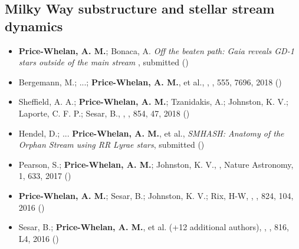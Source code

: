 \documentclass[12pt,letterpaper]{article}
\begin{document}
    \subsection*{Milky Way substructure and stellar stream dynamics}
    \begin{itemize}

\item {\bf Price-Whelan, A. M.}; Bonaca, A.
    {\it Off the beaten path: Gaia reveals GD-1 stars outside of the main stream
},
    submitted ()

\item Bergemann, M.; ...; {\bf Price-Whelan, A. M.}, et al.,
    ,
    \nature, 555, 7696, 2018 ()

\item Sheffield, A. A.; {\bf Price-Whelan, A. M.}; Tzanidakis, A.; Johnston, K. V.; Laporte, C. F. P.; Sesar, B.,
    ,
    \apj, 854, 47, 2018 ()

\item Hendel, D.; ... {\bf Price-Whelan, A. M.}, et al.,
    {\it SMHASH: Anatomy of the Orphan Stream using RR Lyrae stars},
    submitted ()

\item Pearson, S.; {\bf Price-Whelan, A. M.}; Johnston, K. V.,
    ,
    Nature Astronomy, 1, 633, 2017 ()

\item {\bf Price-Whelan, A. M.}; Sesar, B.; Johnston, K. V.; Rix, H-W,
    ,
    \apj, 824, 104, 2016 ()

\item Sesar, B.; {\bf Price-Whelan, A. M.}, et al. (+12 additional authors),
    ,
    \apjl, 816, L4, 2016 ()


\end{itemize}
\end{document}
